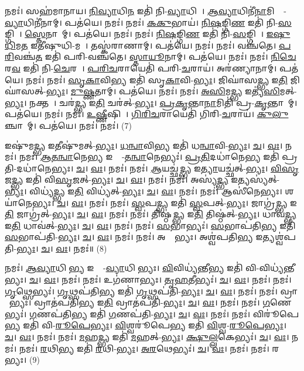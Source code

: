 𑌨𑌮𑌃॑। 𑌸𑌹॑𑌮𑌾𑌨𑌾𑌯। \ul{𑌨𑌿}\ul{𑌵𑍍𑌯𑌾}𑌧𑌿\ul{𑌨} 𑌇𑌤𑌿॑ 𑌨𑌿-\ul{𑌵𑍍𑌯𑌾}𑌧𑌿𑌨𑍇᳚। \ul{𑌆}\ul{𑌵𑍍𑌯𑌾}𑌧𑌿𑌨𑍀॑\ul{𑌨𑌾}𑌮𑌿𑌤𑍍𑌯𑌾᳚-\ul{𑌵𑍍𑌯𑌾}𑌧𑌿𑌨𑍀॑𑌨𑌾𑌮𑍍। 𑌪𑌤॑𑌯𑍇। 𑌨𑌮𑌃॑। 
𑌨𑌮𑌃॑। \ul{𑌕}\ul{𑌕𑍁}𑌭𑌾𑌯॑। \ul{𑌨𑌿}\ul{𑌷}𑌙𑍍𑌗𑌿\ul{𑌣} 𑌇𑌤𑌿॑ 𑌨𑌿-\ul{𑌸}𑌙𑍍𑌗𑌿𑌨𑍇᳚। \ul{𑌸𑍍𑌤𑍇}𑌨𑌾𑌨𑌾᳚𑌮𑍍। 𑌪𑌤॑𑌯𑍇। 𑌨𑌮𑌃॑। 
𑌨𑌮𑌃॑। \ul{𑌨𑌿}\ul{𑌷}𑌙𑍍𑌗𑌿\ul{𑌣} 𑌇𑌤𑌿॑ 𑌨𑌿-\ul{𑌸}𑌙𑍍𑌗𑌿𑌨𑍇᳚। \ul{𑌇}\ul{𑌷𑍁}\ul{𑌧𑌿}𑌮\ul{𑌤} 𑌇𑌤𑍀॑𑌷𑍁𑌧𑌿-𑌮𑌤𑍇᳚। 𑌤𑌸𑍍𑌕॑𑌰𑌾𑌣𑌾𑌮𑍍। 𑌪𑌤॑𑌯𑍇। 𑌨𑌮𑌃॑। 
𑌨𑌮𑌃॑। 𑌵𑌞𑍍𑌚॑𑌤𑍇। \ul{𑌪}\ul{𑌰𑌿}𑌵𑌞𑍍𑌚॑\ul{𑌤} 𑌇𑌤𑌿॑ 𑌪𑌰𑌿-𑌵𑌞𑍍𑌚॑𑌤𑍇। \ul{𑌸𑍍𑌤𑌾}\ul{𑌯𑍂}𑌨𑌾𑌮𑍍। 𑌪𑌤॑𑌯𑍇। 𑌨𑌮𑌃॑। 
𑌨𑌮𑌃॑। \ul{𑌨𑌿}\ul{𑌚𑍇}𑌰\ul{𑌵} 𑌇𑌤𑌿॑ 𑌨𑌿-\ul{𑌚𑍇}𑌰𑌵𑍇᳚। \ul{𑌪}\ul{𑌰𑌿}\ul{𑌚}𑌰𑌾𑌯𑍇𑌤𑌿॑ 𑌪𑌰𑌿-\ul{𑌚}𑌰𑌾𑌯॑। 𑌅𑌰॑𑌣𑍍𑌯𑌾𑌨𑌾𑌮𑍍। 𑌪𑌤॑𑌯𑍇। 𑌨𑌮𑌃॑। 
𑌨𑌮𑌃॑। \ul{𑌸𑍃}\ul{𑌕𑌾}𑌵𑌿\ul{𑌭𑍍𑌯} 𑌇𑌤𑌿॑ 𑌸𑍃\ul{𑌕𑌾}𑌵𑌿-\ul{𑌭𑍍𑌯𑌃}। 𑌜𑌿𑌘𑌾॑𑌸\ul{𑌦𑍍𑌭𑍍𑌯} 𑌇\ul{𑌤𑌿} 𑌜𑌿𑌘𑌾॑𑌸𑌤𑍍-\ul{𑌭𑍍𑌯𑌃}। \ul{𑌮𑍁}\ul{𑌷𑍍𑌣}𑌤𑌾𑌮𑍍। 𑌪𑌤॑𑌯𑍇। 𑌨𑌮𑌃॑। 
𑌨𑌮𑌃॑। \ul{𑌅}\ul{𑌸𑌿}𑌮\ul{𑌦𑍍𑌭𑍍𑌯} 𑌇𑌤𑍍𑌯॑\ul{𑌸𑌿}𑌮𑌤𑍍-\ul{𑌭𑍍𑌯𑌃}। 𑌨𑌕𑍍𑌤𑌮𑍍᳚। 𑌚𑌰॑\ul{𑌦𑍍𑌭𑍍𑌯} 𑌇\ul{𑌤𑌿} 𑌚𑌰॑𑌤𑍍-\ul{𑌭𑍍𑌯𑌃}। \ul{𑌪𑍍𑌰}\ul{𑌕𑍃}𑌨𑍍𑌤𑌾\ul{𑌨𑌾}𑌮𑌿𑌤𑌿॑ 𑌪𑍍𑌰-\ul{𑌕𑍃}𑌨𑍍𑌤𑌾𑌨𑌾᳚𑌮𑍍। 𑌪𑌤॑𑌯𑍇। 𑌨𑌮𑌃॑। 
𑌨𑌮𑌃॑। \ul{𑌉}\ul{𑌷𑍍𑌣𑍀}𑌷𑌿𑌣𑍇᳚। \ul{𑌗𑌿}\ul{𑌰𑌿}\ul{𑌚}𑌰𑌾𑌯𑍇𑌤𑌿॑ 𑌗𑌿𑌰𑌿-\ul{𑌚}𑌰𑌾𑌯॑। \ul{𑌕𑍁}\ul{𑌲𑍁}𑌞𑍍𑌚𑌾𑌨𑌾᳚𑌮𑍍। 𑌪𑌤॑𑌯𑍇। 𑌨𑌮𑌃॑। 𑌨𑌮𑌃॑। (7)


𑌇𑌷𑍁॑𑌮\ul{𑌦𑍍𑌭𑍍𑌯} 𑌇𑌤𑍀𑌷𑍁॑𑌮𑌤𑍍-\ul{𑌭𑍍𑌯𑌃}। \ul{𑌧}\ul{𑌨𑍍𑌵𑌾}𑌵𑌿\ul{𑌭𑍍𑌯} 𑌇𑌤𑌿॑ 𑌧\ul{𑌨𑍍𑌵𑌾}𑌵𑌿-\ul{𑌭𑍍𑌯𑌃}। \ul{𑌚}। \ul{𑌵𑌃}। 𑌨𑌮𑌃॑। 
𑌨𑌮𑌃॑। \ul{𑌆}\ul{𑌤}\ul{𑌨𑍍𑌵𑌾}𑌨𑍇\ul{𑌭𑍍𑌯} 𑌇𑌤𑍍𑌯𑌾᳚-\ul{𑌤}\ul{𑌨𑍍𑌵𑌾}𑌨𑍇𑌭𑍍𑌯𑌃॑। \ul{𑌪𑍍𑌰}\ul{𑌤𑌿}𑌦𑌧𑌾॑𑌨𑍇\ul{𑌭𑍍𑌯} 𑌇𑌤𑌿॑ 𑌪𑍍𑌰𑌤𑌿-𑌦𑌧𑌾॑𑌨𑍇𑌭𑍍𑌯𑌃। \ul{𑌚}। \ul{𑌵𑌃}। 𑌨𑌮𑌃॑। 
𑌨𑌮𑌃॑। \ul{𑌆}𑌯𑌚𑍍𑌛॑\ul{𑌦𑍍𑌭𑍍𑌯} 𑌇\ul{𑌤𑍍𑌯𑌾}𑌯𑌚𑍍𑌛॑𑌤𑍍-\ul{𑌭𑍍𑌯𑌃}। \ul{𑌵𑌿}\ul{𑌸𑍃}𑌜\ul{𑌦𑍍𑌭𑍍𑌯} 𑌇𑌤𑌿॑ 𑌵𑌿\ul{𑌸𑍃}𑌜𑌤𑍍-\ul{𑌭𑍍𑌯𑌃}। \ul{𑌚}। \ul{𑌵𑌃}। 𑌨𑌮𑌃॑। 
𑌨𑌮𑌃॑। 𑌅𑌸𑍍𑌯॑\ul{𑌦𑍍𑌭𑍍𑌯} 𑌇𑌤𑍍𑌯𑌸𑍍𑌯॑𑌤𑍍-\ul{𑌭𑍍𑌯𑌃}। 𑌵𑌿𑌧𑍍𑌯॑\ul{𑌦𑍍𑌭𑍍𑌯} 𑌇\ul{𑌤𑌿} 𑌵𑌿𑌧𑍍𑌯॑𑌤𑍍-\ul{𑌭𑍍𑌯𑌃}। \ul{𑌚}। \ul{𑌵𑌃}। 𑌨𑌮𑌃॑। 
𑌨𑌮𑌃॑। 𑌆𑌸𑍀॑𑌨𑍇𑌭𑍍𑌯𑌃। 𑌶𑌯𑌾॑𑌨𑍇𑌭𑍍𑌯𑌃। \ul{𑌚}। \ul{𑌵𑌃}। 𑌨𑌮𑌃॑। 
𑌨𑌮𑌃॑। \ul{𑌸𑍍𑌵}𑌪\ul{𑌦𑍍𑌭𑍍𑌯} 𑌇𑌤𑌿॑ \ul{𑌸𑍍𑌵}𑌪𑌤𑍍-\ul{𑌭𑍍𑌯𑌃}। 𑌜𑌾𑌗𑍍𑌰॑\ul{𑌦𑍍𑌭𑍍𑌯} 𑌇\ul{𑌤𑌿} 𑌜𑌾𑌗𑍍𑌰॑𑌤𑍍-\ul{𑌭𑍍𑌯𑌃}। \ul{𑌚}। \ul{𑌵𑌃}। 𑌨𑌮𑌃॑। 
𑌨𑌮𑌃॑। 𑌤𑌿𑌷𑍍𑌠॑\ul{𑌦𑍍𑌭𑍍𑌯} 𑌇\ul{𑌤𑌿} 𑌤𑌿𑌷𑍍𑌠॑𑌤𑍍-\ul{𑌭𑍍𑌯𑌃}। 𑌧𑌾𑌵॑\ul{𑌦𑍍𑌭𑍍𑌯} 𑌇\ul{𑌤𑌿} 𑌧𑌾𑌵॑𑌤𑍍-\ul{𑌭𑍍𑌯𑌃}। \ul{𑌚}। \ul{𑌵𑌃}। 𑌨𑌮𑌃॑। 
𑌨𑌮𑌃॑। \ul{𑌸}𑌭𑌾𑌭𑍍𑌯𑌃॑। \ul{𑌸}𑌭𑌾𑌪॑𑌤𑌿\ul{𑌭𑍍𑌯} 𑌇𑌤𑌿॑ \ul{𑌸}𑌭𑌾𑌪॑𑌤𑌿-\ul{𑌭𑍍𑌯𑌃}। \ul{𑌚}। \ul{𑌵𑌃}। 𑌨𑌮𑌃॑। 
𑌨𑌮𑌃॑। 𑌅𑌶𑍍𑌵𑍇᳚𑌭𑍍𑌯𑌃। 𑌅𑌶𑍍𑌵॑𑌪𑌤𑌿\ul{𑌭𑍍𑌯} 𑌇𑌤𑍍𑌯𑌶𑍍𑌵॑𑌪𑌤𑌿-\ul{𑌭𑍍𑌯𑌃}। \ul{𑌚}। \ul{𑌵𑌃}। 𑌨𑌮𑌃॑॥ (8)


𑌨𑌮𑌃॑। \ul{𑌆}\ul{𑌵𑍍𑌯𑌾}𑌧𑌿𑌨𑍀᳚\ul{𑌭𑍍𑌯} 𑌇𑌤𑍍𑌯𑌾᳚-\ul{𑌵𑍍𑌯𑌾}𑌧𑌿𑌨𑍀᳚𑌭𑍍𑌯𑌃। \ul{𑌵𑌿}𑌵𑌿𑌧𑍍𑌯॑𑌨𑍍𑌤𑍀\ul{𑌭𑍍𑌯} 𑌇𑌤𑌿॑ 𑌵𑌿-𑌵𑌿𑌧𑍍𑌯॑𑌨𑍍𑌤𑍀𑌭𑍍𑌯𑌃। \ul{𑌚}। \ul{𑌵𑌃}। 𑌨𑌮𑌃॑। 𑌨𑌮𑌃॑। 𑌉𑌗॑𑌣𑌾𑌭𑍍𑌯𑌃। \ul{𑌤𑍃}\ul{}\ul{𑌹}𑌤𑍀𑌭𑍍𑌯𑌃॑। \ul{𑌚}। \ul{𑌵𑌃}। 𑌨𑌮𑌃॑। 
𑌨𑌮𑌃॑। \ul{𑌗𑍃}𑌥𑍍𑌸𑍇𑌭𑍍𑌯𑌃॑। \ul{𑌗𑍃}𑌥𑍍𑌸𑌪॑𑌤𑌿\ul{𑌭𑍍𑌯} 𑌇𑌤𑌿॑ \ul{𑌗𑍃}𑌥𑍍𑌸𑌪॑𑌤𑌿-\ul{𑌭𑍍𑌯𑌃}। \ul{𑌚}। \ul{𑌵𑌃}। 𑌨𑌮𑌃॑। 
𑌨𑌮𑌃॑। 𑌵𑍍𑌰𑌾𑌤𑍇᳚𑌭𑍍𑌯𑌃। 𑌵𑍍𑌰𑌾𑌤॑𑌪𑌤𑌿\ul{𑌭𑍍𑌯} 𑌇\ul{𑌤𑌿} 𑌵𑍍𑌰𑌾𑌤॑𑌪𑌤𑌿-\ul{𑌭𑍍𑌯𑌃}। \ul{𑌚}। \ul{𑌵𑌃}। 𑌨𑌮𑌃॑। 
𑌨𑌮𑌃॑। \ul{𑌗}𑌣𑍇𑌭𑍍𑌯𑌃॑। \ul{𑌗}𑌣𑌪॑𑌤𑌿\ul{𑌭𑍍𑌯} 𑌇𑌤𑌿॑ \ul{𑌗}𑌣𑌪॑𑌤𑌿-\ul{𑌭𑍍𑌯𑌃}। \ul{𑌚}। \ul{𑌵𑌃}। 𑌨𑌮𑌃॑। 
𑌨𑌮𑌃॑। 𑌵𑌿𑌰𑍂॑𑌪𑍇\ul{𑌭𑍍𑌯} 𑌇𑌤𑌿॑ 𑌵𑌿-\ul{𑌰𑍂}\ul{𑌪𑍇}\ul{𑌭𑍍𑌯𑌃}। \ul{𑌵𑌿}𑌶𑍍𑌵𑌰𑍂॑𑌪𑍇\ul{𑌭𑍍𑌯} 𑌇𑌤𑌿॑ \ul{𑌵𑌿}𑌶𑍍𑌵-\ul{𑌰𑍂}\ul{𑌪𑍇}\ul{𑌭𑍍𑌯𑌃}। \ul{𑌚}। \ul{𑌵𑌃}। 𑌨𑌮𑌃॑। 
𑌨𑌮𑌃॑। \ul{𑌮}𑌹\ul{𑌦𑍍𑌭𑍍𑌯} 𑌇𑌤𑌿॑ \ul{𑌮}𑌹𑌤𑍍-\ul{𑌭𑍍𑌯𑌃}। \ul{𑌕𑍍𑌷𑍁}\ul{𑌲𑍍𑌲}𑌕𑍇𑌭𑍍𑌯𑌃॑। \ul{𑌚}। \ul{𑌵𑌃}। 𑌨𑌮𑌃॑। 
𑌨𑌮𑌃॑। \ul{𑌰}𑌥𑌿\ul{𑌭𑍍𑌯} 𑌇𑌤𑌿॑ \ul{𑌰}𑌥𑌿-\ul{𑌭𑍍𑌯𑌃}। \ul{𑌅}\ul{𑌰}𑌥𑍇𑌭𑍍𑌯𑌃॑। \ul{𑌚}। \ul{𑌵𑌃}। 𑌨𑌮𑌃॑। 
𑌨𑌮𑌃॑। 𑌰𑌥𑍇᳚𑌭𑍍𑌯𑌃। (9)


